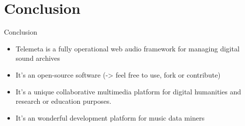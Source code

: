 \documentclass[final, hyperref, table]{beamer}
\begin{document}
\section{Conclusion}




\begin{frame}{Conclusion}
  \begin{block}{}
    \begin{itemize}[<+->]
    \item Telemeta is a \alert{fully operational} web audio framework
      for managing digital sound archives 
    \item It's an \alert{open-source} software (-> feel free to use,
      fork or contribute)
    \item It's a \alert{unique collaborative multimedia platform} for digital humanities and research or education purposes.
    \item It's an \alert{wonderful development platform} for music data miners
    \end{itemize}
  \end{block}
\end{frame}
\end{document}
